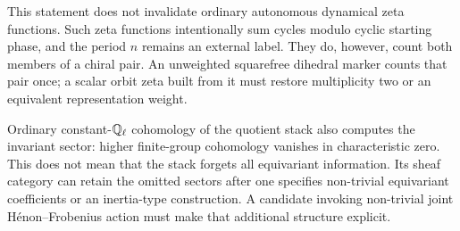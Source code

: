 This statement does not invalidate ordinary autonomous dynamical zeta
functions.  Such zeta functions intentionally sum cycles modulo cyclic
starting phase, and the period $n$ remains an external label.  They do,
however, count both members of a chiral pair.  An unweighted squarefree
dihedral marker counts that pair once; a scalar orbit zeta built from it must
restore multiplicity two or an equivalent representation weight.

Ordinary constant-$\mathbb Q_\ell$ cohomology of the quotient stack also computes the
invariant sector: higher finite-group cohomology vanishes in characteristic
zero.  This does not mean that the stack forgets all equivariant information.
Its sheaf category can retain the omitted sectors after one specifies
non-trivial equivariant coefficients or an inertia-type construction.  A
candidate invoking non-trivial joint H\'enon--Frobenius action must make that
additional structure explicit.

